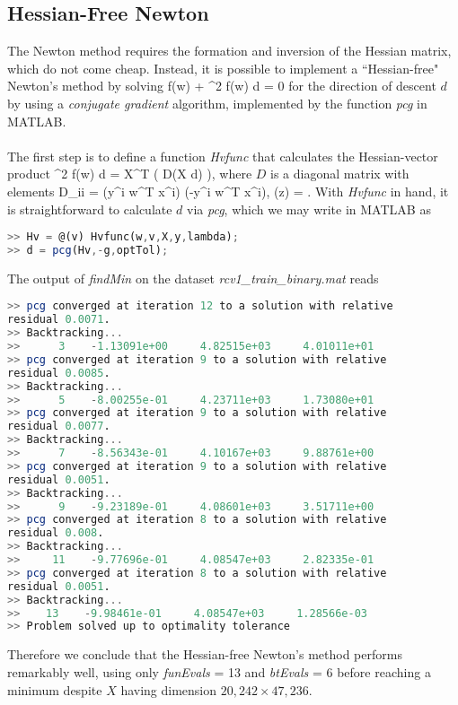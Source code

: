 \subsection{Hessian-Free Newton}

The Newton method requires the formation and inversion of the Hessian matrix, which do not come cheap. Instead, it is possible to implement a ``Hessian-free" Newton's method by solving 
\be \nabla f(w) + \nabla^2 f(w) \; d = 0 \ee
for the direction of descent $d$ by using a \textit{conjugate gradient} algorithm, implemented by the function \textit{pcg} in MATLAB.\\
\\
The first step is to define a function \textit{Hvfunc} that calculates the Hessian-vector product
\be \nabla^2 f(w) \; d = X^T ( D(X d) ), \ee
where $D$ is a diagonal matrix with elements
\be D_{ii} = \sigma(y^i w^T x^i) \sigma(-y^i w^T x^i), \;\;\;\;\; \sigma(z) = . \ee
With \textit{Hvfunc} in hand, it is straightforward to calculate $d$ via \textit{pcg}, which we may write in MATLAB as
\begin{lstlisting}[language=octave]
>> Hv = @(v) Hvfunc(w,v,X,y,lambda);
>> d = pcg(Hv,-g,optTol);        
\end{lstlisting}
The output of \textit{findMin} on the dataset \textit{rcv1\_train\_binary.mat} reads
\begin{lstlisting}[language=octave]
>> pcg converged at iteration 12 to a solution with relative 
residual 0.0071.
>> Backtracking...
>>      3    -1.13091e+00     4.82515e+03     4.01011e+01
>> pcg converged at iteration 9 to a solution with relative 
residual 0.0085.
>> Backtracking...
>>      5    -8.00255e-01     4.23711e+03     1.73080e+01
>> pcg converged at iteration 9 to a solution with relative 
residual 0.0077.
>> Backtracking...
>>      7    -8.56343e-01     4.10167e+03     9.88761e+00
>> pcg converged at iteration 9 to a solution with relative 
residual 0.0051.
>> Backtracking...
>>      9    -9.23189e-01     4.08601e+03     3.51711e+00
>> pcg converged at iteration 8 to a solution with relative 
residual 0.008.
>> Backtracking...
>>     11    -9.77696e-01     4.08547e+03     2.82335e-01
>> pcg converged at iteration 8 to a solution with relative 
residual 0.0051.
>> Backtracking...
>>    13    -9.98461e-01     4.08547e+03     1.28566e-03
>> Problem solved up to optimality tolerance
\end{lstlisting}
Therefore we conclude that the Hessian-free Newton's method performs remarkably well, using only \textit{funEvals} = 13 and \textit{btEvals} = 6 before reaching a minimum despite $X$ having dimension $20,242 \times 47,236$.



